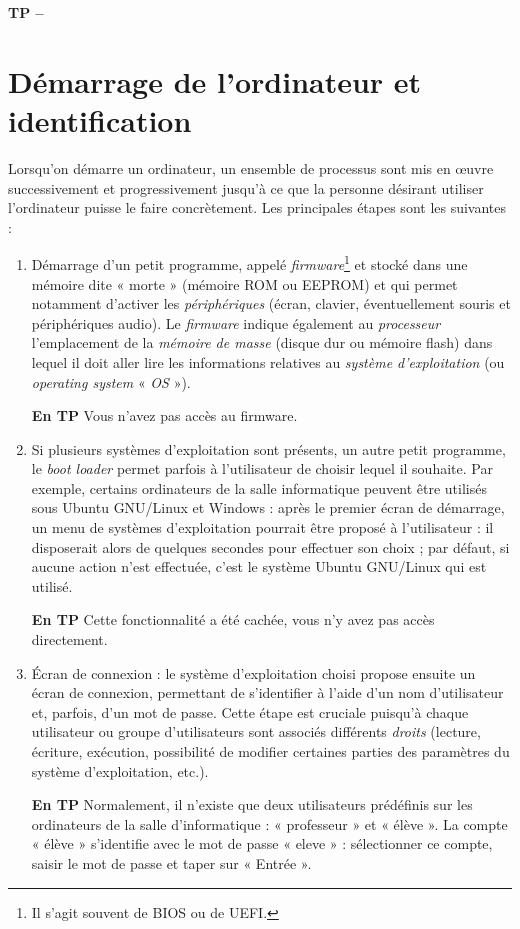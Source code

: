 

%



\begin{center}
{\Large\bf TP \no {\num} -- \descrip}
\end{center}

\section{Démarrage de l'ordinateur et identification}

Lorsqu'on démarre un ordinateur, un ensemble de processus sont mis en œuvre successivement et progressivement jusqu'à ce que la personne désirant utiliser l'ordinateur puisse le faire concrètement. Les principales étapes sont les suivantes :
\begin{enumerate}
 \item Démarrage d'un petit programme, appelé \textit{firmware}\footnote{Il s'agit souvent de BIOS ou de UEFI.} et stocké dans une mémoire dite « morte » (mémoire ROM ou EEPROM) et qui permet notamment d'activer les \textit{périphériques} (écran, clavier, éventuellement souris et périphériques audio). Le \textit{firmware} indique également au \textit{processeur} l'emplacement de la \textit{mémoire de masse} (disque dur ou mémoire flash) dans lequel il doit aller lire les informations relatives au \textit{système d'exploitation} (ou \textit{operating system} « \textit{OS} »).
 
 \textbf{En TP} Vous n'avez pas accès au firmware.
 
 \item Si plusieurs systèmes d'exploitation sont présents, un autre petit programme, le \textit{boot loader} permet parfois à l'utilisateur de choisir lequel il souhaite. Par exemple, certains ordinateurs de la salle informatique peuvent être utilisés sous Ubuntu GNU/Linux et Windows : après le premier écran de démarrage, un menu de systèmes d'exploitation pourrait être proposé à l'utilisateur : il disposerait alors de quelques secondes pour effectuer son choix ; par défaut, si aucune action n'est effectuée, c'est le système Ubuntu GNU/Linux qui est utilisé. 
 
 \textbf{En TP} Cette fonctionnalité a été cachée, vous n'y avez pas accès directement.
 
 
 \item Écran de connexion : le système d'exploitation choisi propose ensuite un écran de connexion, permettant de s'identifier à l'aide d'un nom d'utilisateur et, parfois, d'un mot de passe. Cette étape est cruciale puisqu'à chaque utilisateur ou groupe d'utilisateurs sont associés différents \textit{droits} (lecture, écriture, exécution, possibilité de modifier certaines parties des paramètres du système d'exploitation, etc.). 
 
 \textbf{En TP} Normalement, il n'existe que deux utilisateurs prédéfinis sur les ordinateurs de la salle d'informatique : « professeur » et « élève ». La compte « élève » s'identifie avec le mot de passe « eleve » : sélectionner ce compte, saisir le mot de passe et taper sur « Entrée ».
 
\end{enumerate}

